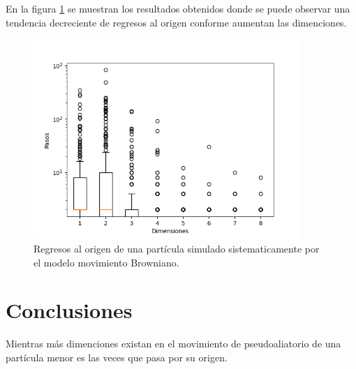 \documentclass{article}
\begin{document}
En la figura \ref{fig} se muestran los resultados obtenidos donde se puede observar una tendencia decreciente de regresos al origen conforme aumentan las dimenciones.


\begin{figure}
  \centering\includegraphics[width=0.9\textwidth]{p1_2.png}
  \caption{Regresos al origen de una part\'{i}cula simulado sistematicamente por el modelo movimiento Browniano.}
  \label{fig}
\end{figure} 



\section{Conclusiones}

Mientras m\'{a}s dimenciones existan en el movimiento de pseudoaliatorio de una part\'{i}cula menor es las veces que pasa por su origen.



 
\end{document}
